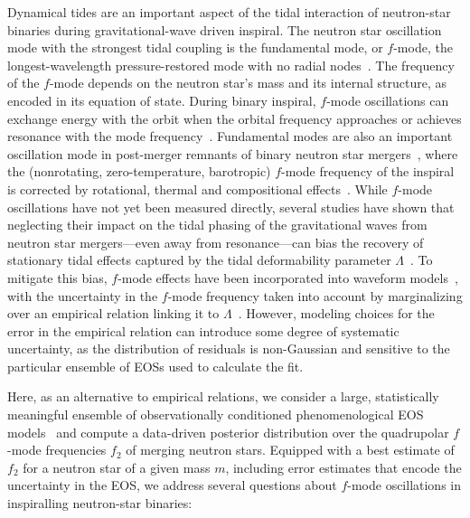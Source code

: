\documentclass[aps,prd,twocolumn,superscriptaddress,footinbib]{revtex4-1}
\newcommand{\todo}[1]{{\color{orange!80!black}{#1}}}
\begin{document}
Dynamical tides are an important aspect of the tidal interaction of neutron-star binaries during gravitational-wave driven inspiral. The neutron star oscillation mode with the strongest tidal coupling is the fundamental mode, or $f$-mode, the longest-wavelength pressure-restored mode with no radial nodes~\cite{KokkotasSchmidt1999}. The frequency of the $f$-mode depends on the neutron star's mass and its internal structure, as encoded in its equation of state. During binary inspiral, $f$-mode oscillations can exchange energy with the orbit when the orbital frequency approaches or achieves resonance with the mode frequency~\cite{Lai1994,HoLai1999}. Fundamental modes are also an important oscillation mode in post-merger remnants of binary neutron star mergers~\cite{StergioulasBauswein2011,BausweinJanka2012}, where the (nonrotating, zero-temperature, barotropic) $f$-mode frequency of the inspiral is corrected by rotational, thermal and compositional effects~\cite{LioutasBauswein2021,RaithelPaschalidis2024,ChabanovRezzolla2023}. While $f$-mode oscillations have not yet been measured directly, several studies have shown that neglecting their impact on the tidal phasing of the gravitational waves from neutron star mergers---even away from resonance---can bias the recovery of stationary tidal effects captured by the tidal deformability parameter $\Lambda$~\cite{PrattenSchmidt2022}. To mitigate this bias, $f$-mode effects have been incorporated into waveform models~\cite{SchmidtHinderer2019}, with the uncertainty in the $f$-mode frequency taken into account by marginalizing over an empirical relation linking it to $\Lambda$~\cite{LackeyPurrer2019,AbacDietrich2024}. However, modeling choices for the error in the empirical relation can introduce some degree of systematic uncertainty, as the distribution of residuals is non-Gaussian and sensitive to the particular ensemble of EOSs used to calculate the fit\todo{~\cite{}}.

Here, as an alternative to empirical relations, we consider a large, statistically meaningful ensemble of observationally  conditioned phenomenological EOS models~\cite{LegredChatziioannou2021} and compute a data-driven posterior distribution over the quadrupolar $f$-mode frequencies $f_2$ of merging neutron stars. Equipped with a best estimate of $f_2$ for a neutron star of a given mass $m$, including error estimates that encode the uncertainty in the EOS, we address several questions about $f$-mode oscillations in inspiralling neutron-star binaries:
\end{document}
